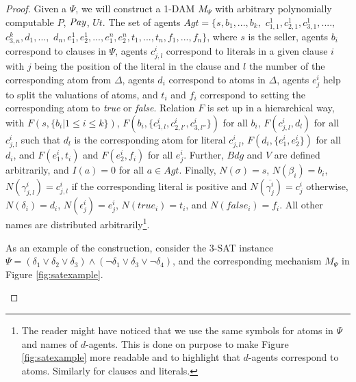 \begin{proof}
    Given a $\Psi$, we will construct a 1-DAM $M_\Psi$ with arbitrary polynomially computable $P$, $\mathit{Pay}$, $Ut$. The set of agents $Agt = \{s, b_1,...,b_k,$ $c^1_{1,1}, c^1_{2,1}, c^1_{3, 1}, ....,$ $c^k_{3, n}, d_1,...,$ $d_n, e^1_1, e^1_2, ..., e^n_1, e^n_2, t_1, ..., t_n, f_1, ..., f_n\}$, where $s$ is the seller, agents $b_i$ correspond to clauses in $\Psi$, agents $c^i_{j,l}$ correspond to literals in a given clause $i$ with $j$ being the position of the literal in the clause and $l$ the number of the corresponding atom from $\Delta$, agents $d_i$ correspond to atoms in $\Delta$, agents $e^i_j$ help to split the valuations of atoms, and $t_i$ and $f_i$ correspond to setting the corresponding atom to \textit{true} or \textit{false}. Relation $F$ is set up in a hierarchical way, with $F(s, \{b_i | 1 \leqslant i \leqslant k\})$, $F(b_i, \{c^i_{1,l}, c^i_{2,l'}, c^i_{3,l''}\})$ for all $b_i$, $F(c^i_{j,l}, d_l)$ for all $c^i_{j,l}$ such that $d_l$ is the corresponding atom for literal $c^i_{j,l}$, $F(d_i, \{e^i_1, e^i_2\})$ for all $d_i$, and $F(e^i_1, t_i)$ and $F(e^i_2, f_i)$ for all $e^i_j$. Further, $Bdg$ and $V$ are defined arbitrarily, and $I(a) = 0$ for all $a\in Agt$. Finally, $N(\sigma) = s$, $N(\beta_i) = b_i$, $N(\gamma^i_{j,l}) = c^i_{j,l}$ if the corresponding literal is positive and $N(\overline{\gamma^i_j}) = c^i_j$ otherwise, $N(\delta_i) = d_i$, $N(\epsilon^i_j) = e^i_j$,  $N(true_i) = t_i$, and $N(false_i) = f_i$. All other names are distributed arbitrarily\footnote{The reader might have noticed that we use the same symbols for atoms in $\Psi$ and names of $d$-agents. This is done on purpose to make Figure \ref{fig:satexample} more readable and to highlight that $d$-agents correspond to atoms. Similarly for clauses and literals.}.

    As an example of the construction, consider the 3-SAT instance $\Psi = (\delta_1 \lor \delta_2 \lor \delta_3) \land (\lnot \delta_1 \lor \delta_3 \lor \lnot \delta_4)$, and the corresponding mechanism $M_\Psi$ in Figure \ref{fig:satexample}.  

    \begin{figure}[h!]
\centering
{}
\end{figure}
\end{proof}
